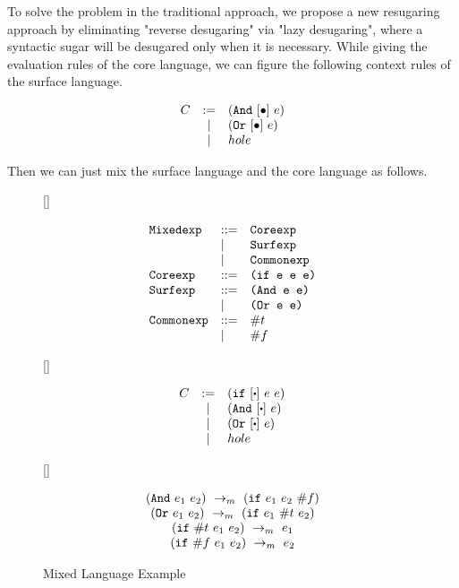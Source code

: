 To solve the problem in the traditional approach, we propose a new resugaring approach by eliminating "reverse desugaring" via "lazy desugaring", where a syntactic sugar will be desugared only when it is necessary. While giving the evaluation rules of the core language, we can figure the following context rules of the surface language.

\[
\begin{array}{lcl}
C &:=& (\mbox{\tt And}~[\bullet]~e)\\
&|& (\mbox{\tt Or}~[\bullet]~e)\\
&|&hole\\
\end{array}
\]

Then we can just mix the surface language and the core language as follows.

\begin{figure}[t]
\centering
{}[\linewidth]{
\begin{flushleft}
\[
\begin{array}{lll}
\mbox{\tt Mixedexp} &::=& \mbox{\tt Coreexp}\\
&|&\mbox{\tt Surfexp}\\
&|&\mbox{\tt Commonexp}\\
\mbox{\tt Coreexp} &::=& \texttt{(if~e~e~e)}\\
\mbox{\tt Surfexp} &::=& \texttt{(And~e~e)}\\
&|&\texttt{(Or~e~e)}\\
\mbox{\tt Commonexp} &::=& \#t\\
&|& \#f\\
\end{array}
\]
\end{flushleft}

}
[\linewidth]{
\begin{flushleft}
\[
\begin{array}{lcl}
C &:=& (\m{if}~[\bigcdot]~e~e)\\
&|& (\m{And}~[\bigcdot]~e)\\
&|& (\m{Or}~[\bigcdot]~e)\\
&|&hole\\
\end{array}
\]
\end{flushleft}

}

[\linewidth]{
\begin{flushleft}
\[
\begin{array}{c}
(\mbox{\tt And}~e_1~e_2) ~\rightarrow_m~(\mbox{\tt if}~e_1~e_2~\#f)\\
(\mbox{\tt Or}~e_1~e_2) ~\rightarrow_m~(\mbox{\tt if}~e_1~\#t~e_2)\\
(\mbox{\tt if}~\#t~e_1~e_2) ~\rightarrow_m~e_1\\
(\mbox{\tt if}~\#f~e_1~e_2) ~\rightarrow_m~e_2 
\end{array}
\]
\end{flushleft}

}

\caption{Mixed Language Example}
\label{fig:mixexample}
\end{figure}

